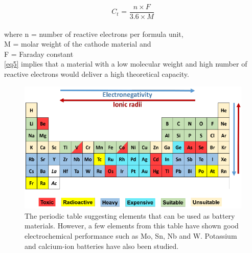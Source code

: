 \begin{equation} \label{eq5}
   C_{t} \text{ = } \frac{n \times F}{3.6 \times M}
\end{equation}\\
where n = number of reactive electrons per formula unit,\\
M = molar weight of the cathode material and\\
F = Faraday constant\\
\ref{eq5} implies that a material with a low molecular weight and high number of reactive electrons would deliver a high theoretical capacity.

\begin{figure}[h!]
\centering
\includegraphics[width=\textwidth]{Figures/chap1fig/pertab}
\caption{The periodic table suggesting elements that can be used as battery materials. However, a few elements from this table have shown good electrochemical performance such as Mo, Sn, Nb and W. Potassium and calcium-ion batteries have also been studied.}
\label{Figures/chap1fig:pertab}
\end{figure}

